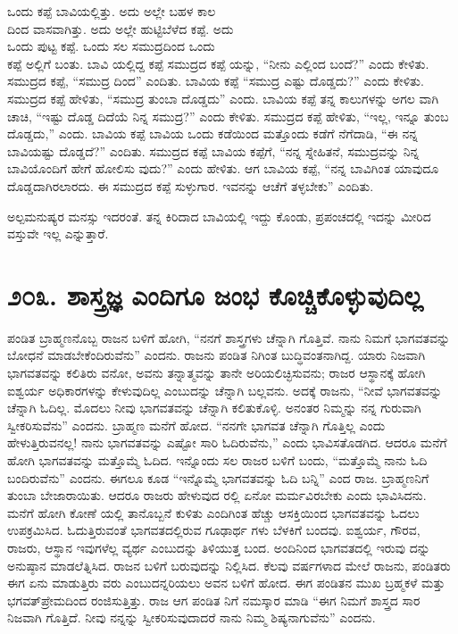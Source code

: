 ಒಂದು ಕಪ್ಪೆ ಬಾವಿಯಲ್ಲಿತ್ತು. ಅದು ಅಲ್ಲೇ ಬಹಳ ಕಾಲ\\ದಿಂದ ವಾಸವಾಗಿತ್ತು. ಅದು ಅಲ್ಲೇ ಹುಟ್ಟಿಬೆಳೆದ ಕಪ್ಪೆ. ಅದು\\ಒಂದು ಪುಟ್ಟ ಕಪ್ಪೆ. ಒಂದು ಸಲ ಸಮುದ್ರದಿಂದ ಒಂದು\\ಕಪ್ಪೆ ಅಲ್ಲಿಗೆ ಬಂತು. ಬಾವಿ ಯಲ್ಲಿದ್ದ ಕಪ್ಪೆ ಸಮುದ್ರದ ಕಪ್ಪೆ ಯನ್ನು, “ನೀನು ಎಲ್ಲಿಂದ ಬಂದೆ?” ಎಂದು ಕೇಳಿತು. ಸಮುದ್ರದ ಕಪ್ಪೆ, “ಸಮುದ್ರ ದಿಂದ” ಎಂದಿತು. ಬಾವಿಯ ಕಪ್ಪೆ “ಸಮುದ್ರ ಎಷ್ಟು ದೊಡ್ಡದು?” ಎಂದು ಕೇಳಿತು. ಸಮುದ್ರದ ಕಪ್ಪೆ ಹೇಳಿತು, “ಸಮುದ್ರ ತುಂಬಾ ದೊಡ್ಡದು” ಎಂದು. ಬಾವಿಯ ಕಪ್ಪೆ ತನ್ನ ಕಾಲುಗಳನ್ನು ಅಗಲ ವಾಗಿ ಚಾಚಿ, “ಇಷ್ಟು ದೊಡ್ಡ ದಿದೆಯೆ ನಿನ್ನ ಸಮುದ್ರ?” ಎಂದು ಕೇಳಿತು. ಸಮುದ್ರದ ಕಪ್ಪೆ ಹೇಳಿತು, “ಇಲ್ಲ, ಇನ್ನೂ ತುಂಬ ದೊಡ್ಡದು,” ಎಂದು. ಬಾವಿಯ ಕಪ್ಪೆ ಬಾವಿಯ ಒಂದು ಕಡೆಯಿಂದ ಮತ್ತೊಂದು ಕಡೆಗೆ ನೆಗೆದಾಡಿ, “ಈ ನನ್ನ ಬಾವಿಯಷ್ಟು ದೊಡ್ಡದೆ?” ಎಂದಿತು. ಸಮುದ್ರದ ಕಪ್ಪೆ ಬಾವಿಯ ಕಪ್ಪೆಗೆ, “ನನ್ನ ಸ್ನೇಹಿತನೆ, ಸಮುದ್ರವನ್ನು ನಿನ್ನ ಬಾವಿಯೊಂದಿಗೆ ಹೇಗೆ ಹೋಲಿಸು ವುದು?” ಎಂದು ಹೇಳಿತು. ಆಗ ಬಾವಿಯ ಕಪ್ಪೆ, “ನನ್ನ ಬಾವಿಗಿಂತ ಯಾವುದೂ ದೊಡ್ಡದಾಗಿರಲಾರದು. ಈ ಸಮುದ್ರದ ಕಪ್ಪೆ ಸುಳ್ಳುಗಾರ. ಇವನನ್ನು ಆಚೆಗೆ ತಳ್ಳಬೇಕು” ಎಂದಿತು.

ಅಲ್ಪಮನುಷ್ಯರ ಮನಸ್ಸು ಇದರಂತೆ. ತನ್ನ ಕಿರಿದಾದ ಬಾವಿಯಲ್ಲಿ ಇದ್ದು ಕೊಂಡು, ಪ್ರಪಂಚದಲ್ಲಿ ಇದನ್ನು ಮೀರಿದ ವಸ್ತುವೇ ಇಲ್ಲ ಎನ್ನುತ್ತಾರೆ.


\section{\num{೨೦೩. } ಶಾಸ್ತ್ರಜ್ಞ ಎಂದಿಗೂ ಜಂಭ ಕೊಚ್ಚಿಕೊಳ್ಳುವುದಿಲ್ಲ}

ಪಂಡಿತ ಬ್ರಾಹ್ಮಣನೊಬ್ಬ ರಾಜನ ಬಳಿಗೆ ಹೋಗಿ, “ನನಗೆ ಶಾಸ್ತ್ರಗಳು ಚೆನ್ನಾಗಿ ಗೊತ್ತಿವೆ. ನಾನು ನಿಮಗೆ ಭಾಗವತವನ್ನು ಬೋಧನೆ ಮಾಡಬೇಕೆಂದಿರುವೆನು” ಎಂದನು. ರಾಜನು ಪಂಡಿತ ನಿಗಿಂತ ಬುದ್ಧಿವಂತನಾಗಿದ್ದ. ಯಾರು ನಿಜವಾಗಿ ಭಾಗವತವನ್ನು ಕಲಿತಿರು ವನೋ, ಅವನು ತನ್ನಾತ್ಮವನ್ನು ತಾನೇ ಅರಿಯಲಿಚ್ಛಿಸುವನು; ರಾಜರ ಆಸ್ಥಾನಕ್ಕೆ ಹೋಗಿ ಐಶ್ವರ್ಯ ಅಧಿಕಾರಗಳನ್ನು ಕೇಳುವುದಿಲ್ಲ ಎಂಬುದನ್ನು ಚೆನ್ನಾಗಿ ಬಲ್ಲವನು. ಅದಕ್ಕೆ ರಾಜನು, “ನೀವೆ ಭಾಗವತವನ್ನು ಚೆನ್ನಾಗಿ ಓದಿಲ್ಲ. ಮೊದಲು ನೀವು ಭಾಗವತವನ್ನು ಚೆನ್ನಾಗಿ ಕಲಿತುಕೊಳ್ಳಿ. ಅನಂತರ ನಿಮ್ಮನ್ನು ನನ್ನ ಗುರುವಾಗಿ ಸ್ವೀಕರಿಸುವೆನು” ಎಂದನು. ಬ್ರಾಹ್ಮಣ ಮನೆಗೆ ಹೋದ. “ನನಗೇ ಭಾಗವತ ಚೆನ್ನಾಗಿ ಗೊತ್ತಿಲ್ಲ ಎಂದು ಹೇಳುತ್ತಿರುವನಲ್ಲ! ನಾನು ಭಾಗವತವನ್ನು ಎಷ್ಟೋ ಸಾರಿ ಓದಿರುವೆನು,” ಎಂದು ಭಾವಿಸತೊಡಗಿದ. ಆದರೂ ಮನೆಗೆ ಹೋಗಿ ಭಾಗವತವನ್ನು ಮತ್ತೊಮ್ಮೆ ಓದಿದ. ಇನ್ನೊಂದು ಸಲ ರಾಜರ ಬಳಿಗೆ ಬಂದು, “ಮತ್ತೊಮ್ಮೆ ನಾನು ಓದಿ ಬಂದಿರುವೆನು” ಎಂದನು. ಈಗಲೂ ಕೂಡ “ಇನ್ನೊಮ್ಮೆ ಭಾಗವತವನ್ನು ಓದಿ ಬನ್ನಿ” ಎಂದ ರಾಜ. ಬ್ರಾಹ್ಮಣನಿಗೆ ತುಂಬಾ ಬೇಜಾರಾಯಿತು. ಆದರೂ ರಾಜರು ಹೇಳುವುದ ರಲ್ಲಿ ಏನೋ ಮರ್ಮವಿರಬೇಕು ಎಂದು ಭಾವಿಸಿದನು. ಮನೆಗೆ ಹೋಗಿ ಕೋಣೆ ಯಲ್ಲಿ ತಾನೊಬ್ಬನೆ ಕುಳಿತು ಎಂದಿಗಿಂತ ಹೆಚ್ಚು ಆಸಕ್ತಿಯಿಂದ ಭಾಗವತವನ್ನು ಓದಲು ಉಪಕ್ರಮಿಸಿದ. ಓದುತ್ತಿರುವಂತೆ ಭಾಗವತದಲ್ಲಿರುವ ಗೂಢಾರ್ಥ ಗಳು ಬೆಳಕಿಗೆ ಬಂದವು. ಐಶ್ವರ್ಯ, ಗೌರವ, ರಾಜರು, ಆಸ್ಥಾನ ಇವುಗಳೆಲ್ಲ ವ್ಯರ್ಥ ಎಂಬುದನ್ನು ತಿಳಿಯುತ್ತ ಬಂದ. ಅಂದಿನಿಂದ ಭಾಗವತದಲ್ಲಿ ಇರುವು ದನ್ನು ಅನುಷ್ಠಾನ ಮಾಡಲೆತ್ನಿಸಿದ. ರಾಜನ ಬಳಿಗೆ ಬರುವುದನ್ನು ನಿಲ್ಲಿಸಿದ. ಕೆಲವು ವರ್ಷಗಳಾದ ಮೇಲೆ ರಾಜನು, ಪಂಡಿತರು ಈಗ ಏನು ಮಾಡುತ್ತಿರು ವರು ಎಂಬುದನ್ನರಿಯಲು ಅವನ ಬಳಿಗೆ ಹೋದ. ಈಗ ಪಂಡಿತನ ಮುಖ ಬ್ರಹ್ಮಕಳೆ ಮತ್ತು ಭಗವತ್​ಪ್ರೇಮದಿಂದ ರಂಜಿಸುತ್ತಿತ್ತು. ರಾಜ ಆಗ ಪಂಡಿತ ನಿಗೆ ನಮಸ್ಕಾರ ಮಾಡಿ “ಈಗ ನಿಮಗೆ ಶಾಸ್ತ್ರದ ಸಾರ ನಿಜವಾಗಿ ಗೊತ್ತಿದೆ. ನೀವು ನನ್ನನ್ನು ಸ್ವೀಕರಿಸುವುದಾದರೆ ನಾನು ನಿಮ್ಮ ಶಿಷ್ಯನಾಗುವೆನು” ಎಂದನು.



